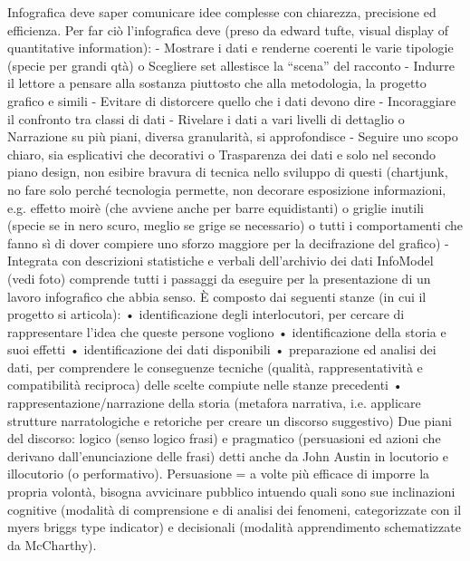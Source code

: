 Infografica deve saper comunicare idee complesse con chiarezza, precisione ed efficienza. Per far ciò l'infografica deve (preso da edward tufte, visual display of quantitative information):
-	Mostrare i dati e renderne coerenti le varie tipologie (specie per grandi qtà)
    o	Scegliere set allestisce la “scena” del racconto
-	Indurre il lettore a pensare alla sostanza piuttosto che alla metodologia, la progetto grafico e simili
-	Evitare di distorcere quello che i dati devono dire
-	Incoraggiare il confronto tra classi di dati
-	Rivelare i dati a vari livelli di dettaglio
    o	Narrazione su più piani, diversa granularità, si approfondisce 
-	Seguire uno scopo chiaro, sia esplicativi che decorativi
    o	Trasparenza dei dati e solo nel secondo piano design, non esibire bravura di tecnica nello sviluppo di questi (chartjunk, no fare solo perché tecnologia permette, non decorare esposizione informazioni, e.g. effetto moirè (che avviene anche per barre equidistanti) o griglie inutili (specie se in nero scuro, meglio se grige se necessario) o tutti i comportamenti che fanno sì di dover compiere uno sforzo maggiore per la decifrazione del grafico)
-	Integrata con descrizioni statistiche e verbali dell'archivio dei dati
InfoModel (vedi foto) comprende tutti i passaggi da eseguire per la presentazione di un lavoro infografico che abbia senso. È composto dai seguenti stanze (in cui il progetto si articola):
•	identificazione degli interlocutori, per cercare di rappresentare l'idea che queste persone vogliono
•	identificazione della storia e suoi effetti
•	identificazione dei dati disponibili
•	preparazione ed analisi dei dati, per comprendere le conseguenze tecniche (qualità, rappresentatività e compatibilità reciproca) delle scelte compiute nelle stanze precedenti
•	rappresentazione/narrazione della storia (metafora narrativa, i.e. applicare strutture narratologiche e retoriche per creare un discorso suggestivo)
Due piani del discorso: logico (senso logico frasi) e pragmatico (persuasioni ed azioni che derivano dall'enunciazione delle frasi) detti anche da John Austin in locutorio e illocutorio (o performativo).
Persuasione = a volte più efficace di imporre la propria volontà, bisogna avvicinare pubblico intuendo quali sono sue inclinazioni cognitive (modalità di comprensione e di analisi dei fenomeni, categorizzate con il myers briggs type indicator) e decisionali (modalità apprendimento schematizzate da McCharthy).
